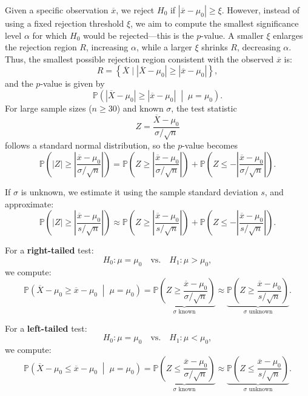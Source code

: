 Given a specific observation \(\overline{x}\), we reject \(H_0\) if \(\left| \overline{x} - \mu_0 \right| \geq \xi\). However, instead of using a fixed rejection threshold \(\xi\), we aim to compute the smallest significance level \(\alpha\) for which \(H_0\) would be rejected—this is the \(p\)-value. A smaller \(\xi\) enlarges the rejection region \(R\), increasing \(\alpha\), while a larger \(\xi\) shrinks \(R\), decreasing \(\alpha\). Thus, the smallest possible rejection region consistent with the observed \(\overline{x}\) is:
\[
  R = \left\{ \overline{X} \; \bigg| \; \left| \overline{X} - \mu_0 \right| \geq \left| \overline{x} - \mu_0 \right| \right\},
\]
and the \(p\)-value is given by
\[
  \mathbb{P}\left( \left| \overline{X} - \mu_0 \right| \geq \left| \overline{x} - \mu_0 \right| \;\middle|\; \mu = \mu_0 \right).
\]
For large sample sizes (\(n \geq 30\)) and known \(\sigma\), the test statistic
\[
  Z = \frac{\overline{X} - \mu_0}{\sigma / \sqrt{n}}
\]
follows a standard normal distribution, so the \(p\)-value becomes
\[
  \mathbb{P}\left( \left| Z \right| \geq \left| \frac{\overline{x} - \mu_0}{\sigma / \sqrt{n}} \right| \right) = \mathbb{P}\left( Z \geq \left| \frac{\overline{x} - \mu_0}{\sigma / \sqrt{n}} \right| \right) + \mathbb{P}\left( Z \leq -\left| \frac{\overline{x} - \mu_0}{\sigma / \sqrt{n}} \right| \right).
\]

If \(\sigma\) is unknown, we estimate it using the sample standard deviation \(s\), and approximate:
\[
  \mathbb{P}\left( \left| Z \right| \geq \left| \frac{\overline{x} - \mu_0}{s / \sqrt{n}} \right| \right) \approx \mathbb{P}\left( Z \geq \left| \frac{\overline{x} - \mu_0}{s / \sqrt{n}} \right| \right) + \mathbb{P}\left( Z \leq -\left| \frac{\overline{x} - \mu_0}{s / \sqrt{n}} \right| \right).
\]

For a \textbf{right-tailed} test:
\[
  H_0: \mu = \mu_0 \quad \text{vs.} \quad H_1: \mu > \mu_0,
\]
we compute:
\[
  \mathbb{P}\left( \overline{X} - \mu_0 \geq \overline{x} - \mu_0 \;\middle|\; \mu = \mu_0 \right) = \underbrace{ \mathbb{P}\left( Z \geq \frac{\overline{x} - \mu_0}{\sigma / \sqrt{n}} \right) }_{\text{\(\sigma\) known}} \approx \underbrace{ \mathbb{P}\left( Z \geq \frac{\overline{x} - \mu_0}{s / \sqrt{n}} \right) }_{\text{\(\sigma\) unknown}}.
\]

For a \textbf{left-tailed} test:
\[
  H_0: \mu = \mu_0 \quad \text{vs.} \quad H_1: \mu < \mu_0,
\]
we compute:
\[
  \mathbb{P}\left( \overline{X} - \mu_0 \leq \overline{x} - \mu_0 \;\middle|\; \mu = \mu_0 \right) = \underbrace{ \mathbb{P}\left( Z \leq \frac{\overline{x} - \mu_0}{\sigma / \sqrt{n}} \right) }_{\text{\(\sigma\) known}} \approx \underbrace{ \mathbb{P}\left( Z \leq \frac{\overline{x} - \mu_0}{s / \sqrt{n}} \right) }_{\text{\(\sigma\) unknown}}.
\]

